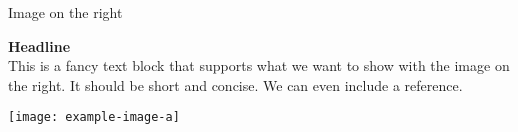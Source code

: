 \begin{frame}[c]{Image on the right}
%
\begin{minipage}{0.45\textwidth}
\textbf{Headline}\\

This is a fancy text block that supports what we want to show with the image on the right. It should be short and concise. We can even include a reference.

\end{minipage}\hfill
\begin{minipage}{0.5\textwidth}
	\texttt{[image: example-image-a]}
\end{minipage}
%
\end{frame}